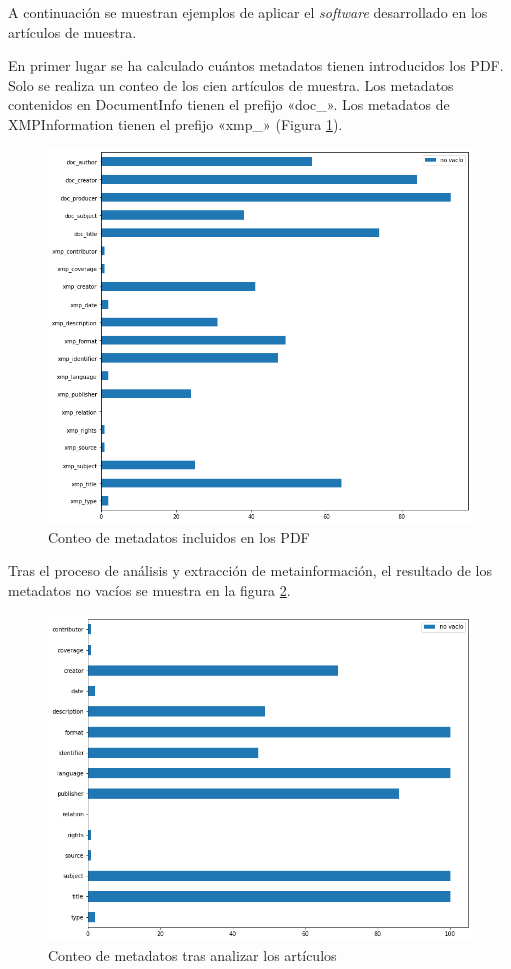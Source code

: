 \documentclass[../main.tex]{subfiles}
\begin{document}
A continuación se muestran ejemplos de aplicar el \textit{software} desarrollado en los artículos de muestra.

En primer lugar se ha calculado cuántos metadatos tienen introducidos los PDF. Solo se realiza un conteo de los cien artículos de muestra. Los metadatos contenidos en DocumentInfo tienen el prefijo «doc\_». Los metadatos de XMPInformation tienen el prefijo «xmp\_» (Figura \ref{fig:pdf-meta-count}).

\begin{figure}[h]
	\centering
	\includegraphics[width=0.9\linewidth]{../images/pdf-metadata-count}
	\caption{Conteo de metadatos incluidos en los PDF}
	\label{fig:pdf-meta-count}
\end{figure}

Tras el proceso de análisis y extracción de metainformación, el resultado de los metadatos no vacíos se muestra en la figura \ref{fig:analytics-meta-count}.

\begin{figure}[h]
	\centering
	\includegraphics[width=0.9\linewidth]{../images/analytics-metadata-count}
	\caption{Conteo de metadatos tras analizar los artículos}
	\label{fig:analytics-meta-count}
\end{figure}
\end{document}

